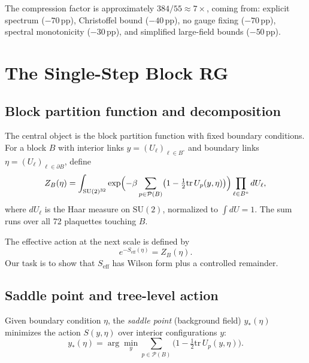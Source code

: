 \documentclass[11pt]{article}
\theoremstyle{definition}
\newcommand{\SU}{\mathrm{SU}}
\newcommand{\tr}{\mathrm{tr}}
\begin{document}
The compression factor is approximately $384/55\approx 7\times$, coming
from: explicit spectrum ($-70$\,pp), Christoffel bound ($-40$\,pp),
no gauge fixing ($-70$\,pp), spectral monotonicity ($-30$\,pp), and
simplified large-field bounds ($-50$\,pp).

\section{The Single-Step Block RG}\label{sec:singlestep}

\subsection{Block partition function and decomposition}\label{subsec:blockZ}

The central object is the block partition function with fixed boundary
conditions.  For a block $B$ with interior links $y=(U_\ell)_{\ell\in B^\circ}$
and boundary links $\eta=(U_\ell)_{\ell\in\partial B}$, define
\begin{equation}\label{eq:blockZ}
Z_B(\eta)=\int_{\SU(2)^{32}}\exp\Bigl(-\beta
\sum_{p\in\mathcal{P}(B)}\bigl(1-\tfrac{1}{2}\tr\,U_p(y,\eta)\bigr)
\Bigr)\prod_{\ell\in B^\circ}dU_\ell,
\end{equation}
where $dU_\ell$ is the Haar measure on $\SU(2)$, normalized to
$\int dU=1$.  The sum runs over all 72 plaquettes touching $B$.

The effective action at the next scale is defined by
\begin{equation}\label{eq:Seff-def}
e^{-S_{\mathrm{eff}}(\eta)}=Z_B(\eta).
\end{equation}
Our task is to show that $S_{\mathrm{eff}}$ has Wilson form plus
a controlled remainder.

\subsection{Saddle point and tree-level action}\label{subsec:saddle}

Given boundary condition $\eta$, the \emph{saddle point} (background
field) $y_*(\eta)$ minimizes the action $S(y,\eta)$ over interior
configurations $y$:
\begin{equation}
y_*(\eta)=\arg\min_y\sum_{p\in\mathcal{P}(B)}
\bigl(1-\tfrac{1}{2}\tr\,U_p(y,\eta)\bigr).
\end{equation}
\end{document}
